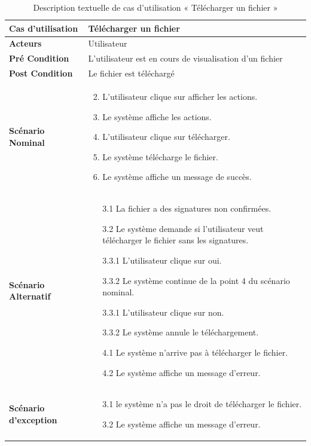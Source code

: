 \begin{longtable}{|p{5cm}|p{10cm}|}
  \caption{Description textuelle de cas d'utilisation « Télécharger un fichier »} \label{tab:description-textuelle-de-cas-d-utilisation-telecharger-un-fichier} \\
\hline
\textbf{Cas d'utilisation}&Télécharger un fichier\\
\hline
\textbf{Acteurs}&Utilisateur\\
\hline
\textbf{Pré Condition}&L'utilisateur est en cours de visualisation d'un fichier\\
\hline
\textbf{Post Condition}&Le fichier est téléchargé\\
\hline
\textbf{Scénario Nominal}&
\vspace{-\baselineskip}
\begin{enumerate}
    \setcounter{enumi}{1}
  \item L'utilisateur clique sur afficher les actions.
  \item Le système affiche les actions.
  \item L'utilisateur clique sur télécharger.
  \item Le système télécharge le fichier.
  \item Le système affiche un message de succès.
\end{enumerate}\\
\hline
\textbf{Scénario Alternatif}&
\vspace{-\baselineskip}
\begin{enumerate}
  \item [3.1] La fichier a des signatures non confirmées.
  \item [3.2] Le système demande si l'utilisateur veut télécharger le fichier sans les signatures.
  \item [3.3.1] L'utilisateur clique sur oui.
  \item [3.3.2] Le système continue de la point 4 du scénario nominal.
  \item [3.3.1] L'utilisateur clique sur non.
  \item [3.3.2] Le système annule le téléchargement.
  \item [4.1] Le système n'arrive pas à télécharger le fichier.
  \item [4.2] Le système affiche un message d'erreur.

\end{enumerate}\\
\hline
\textbf{Scénario d'exception}&
\vspace{-\baselineskip}
\begin{enumerate}
  \item [3.1] le système n'a pas le droit de télécharger le fichier.
  \item [3.2] Le système affiche un message d'erreur.
\end{enumerate}\\
\hline

\end{longtable}


